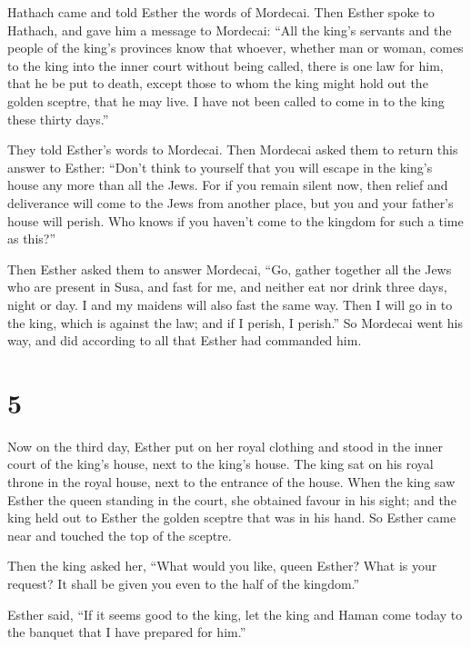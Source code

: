  Hathach came and told Esther the words of Mordecai.
 Then Esther spoke to Hathach, and gave him a message to
Mordecai:  ``All the king's servants and the people of the
king's provinces know that whoever, whether man or woman, comes to the
king into the inner court without being called, there is one law for
him, that he be put to death, except those to whom the king might hold
out the golden sceptre, that he may live. I have not been called to come
in to the king these thirty days.''

 They told Esther's words to Mordecai.  Then
Mordecai asked them to return this answer to Esther: ``Don't think to
yourself that you will escape in the king's house any more than all the
Jews.  For if you remain silent now, then relief and
deliverance will come to the Jews from another place, but you and your
father's house will perish. Who knows if you haven't come to the kingdom
for such a time as this?''

 Then Esther asked them to answer Mordecai, 
``Go, gather together all the Jews who are present in Susa, and fast for
me, and neither eat nor drink three days, night or day. I and my maidens
will also fast the same way. Then I will go in to the king, which is
against the law; and if I perish, I perish.''  So Mordecai
went his way, and did according to all that Esther had commanded him.

\hypertarget{section-4}{%
\section{5}\label{section-4}}

 Now on the third day, Esther put on her royal clothing and
stood in the inner court of the king's house, next to the king's house.
The king sat on his royal throne in the royal house, next to the
entrance of the house.  When the king saw Esther the queen
standing in the court, she obtained favour in his sight; and the king
held out to Esther the golden sceptre that was in his hand. So Esther
came near and touched the top of the sceptre.

 Then the king asked her, ``What would you like, queen
Esther? What is your request? It shall be given you even to the half of
the kingdom.''

 Esther said, ``If it seems good to the king, let the king
and Haman come today to the banquet that I have prepared for him.''

